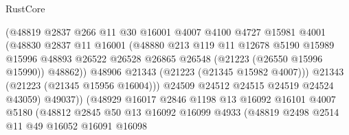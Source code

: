 \begin{lexlean}{RustCore}
\begin{coremodule}
                                (@48819
                                  @2837
                                  @266
                                  @11
                                  @30
                                  @16001
                                  @4007
                                  @4100
                                  @4727
                                  @15981
                                  @4001
                                  (@48830
                                    @2837
                                    @11
                                    @16001
                                    (@48880
                                      @213
                                      @119
                                      @11
                                      @12678
                                      @5190
                                      @15989
                                      @15996
                                      @48893
                                      @26522
                                      @26528
                                      @26865
                                      @26548
                                      (@21223 (@26550 @15996 @15990))
                                      @48862))
                                  @48906
                                  @21343
                                  (@21223 (@21345 @15982 @4007)))
                                @21343
                                (@21223 (@21345 @15956 @16004)))
                              @24509
                              @24512
                              @24515
                              @24519
                              @24524
                              @43059)
                            @49037))
                        (@48929
                          @16017
                          @2846
                          @1198
                          @13
                          @16092
                          @16101
                          @4007
                          @5180
                          (@48812
                            @2845
                            @50
                            @13
                            @16092
                            @16099
                            @4933
                            (@48819
                              @2498
                              @2514
                              @11
                              @49
                              @16052
                              @16091
                              @16098

\end{coremodule}
\end{lexlean}
